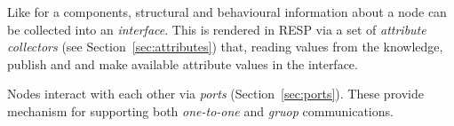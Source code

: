 \documentclass[11pt]{article}
\newcommand{\resp}{\textsf{RESP}}
\begin{document}
Like for a \SCEL{} components, structural and behavioural information about a node 
can be collected into an \emph{interface}. This is rendered in \resp{} via a set of \emph{attribute collectors} (see
Section~\ref{sec:attributes}) that, reading values from the knowledge, publish and 
and make available attribute values in the interface.

Nodes interact with each other via \emph{ports} (Section~\ref{sec:ports}). These provide 
mechanism for supporting both \emph{one-to-one} and \emph{gruop} communications.  

%
\end{document}
